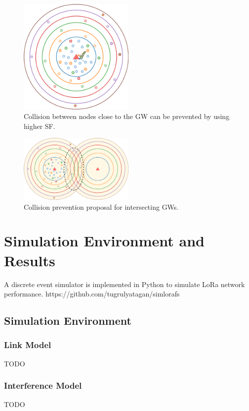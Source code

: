 \documentclass[conference]{IEEEtran}
\begin{document}
\begin{figure}
\centering
\includegraphics[width=0.5\textwidth]{lora2}
\caption{Collision between nodes close to the GW can be prevented by using higher SF.}
\label{fig:proposal_single_gw}
\end{figure}

\begin{figure}
\centering
\includegraphics[width=0.5\textwidth]{lora3}
\caption{Collision prevention proposal for intersecting GWs.}
\label{fig:proposal_multi_gw}
\end{figure}


\section{Simulation Environment and Results} \label{Simulation Environment and Results}
A discrete event simulator is implemented in Python to simulate LoRa network performance. https://github.com/tugrulyatagan/simlorafs

\subsection{Simulation Environment}

\subsubsection{Link Model}
TODO

\subsubsection{Interference Model}
TODO
\end{document}
